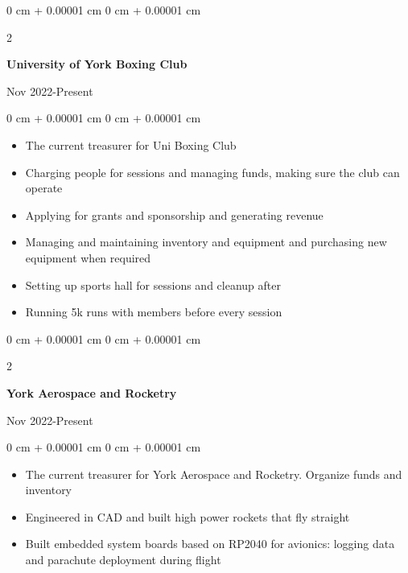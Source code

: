 \documentclass[10pt, letterpaper]{article}
\newenvironment{onecolentry}{
    \begin{adjustwidth}{
        0 cm + 0.00001 cm
    }{
        0 cm + 0.00001 cm
    }
}{
    \end{adjustwidth}
} %
\newenvironment{twocolentry}[2][]{
    \onecolentry
    \def\secondColumn{#2}
    \setcolumnwidth{\fill, 4.5 cm}
    \begin{paracol}{2}
}{
    \switchcolumn \raggedleft \secondColumn
    \end{paracol}
    \endonecolentry
} %
\begin{document}
        \begin{samepage}
            \begin{twocolentry}{
                Nov 2022-Present
            }
                \textbf{University of York Boxing Club}

                \vspace{0.10 cm}
            \end{twocolentry}


            \vspace{0.10 cm}

            \begin{onecolentry}
                \begin{itemize}
                    \item The current treasurer for Uni Boxing Club
                    \item Charging people for sessions and managing funds, making sure the club can operate
                    \item Applying for grants and sponsorship and generating revenue
                    \item Managing and maintaining inventory and equipment and purchasing new equipment when required
                    \item Setting up sports hall for sessions and cleanup after
                    \item Running 5k runs with members before every session
                \end{itemize}
            \end{onecolentry}

        \vspace{0.10 cm}

            \begin{twocolentry}{
                Nov 2022-Present
            }
                \textbf{York Aerospace and Rocketry}

                \vspace{0.10 cm}
            \end{twocolentry}


            \vspace{0.10 cm}

            \begin{onecolentry}
                \begin{itemize}
                    \item The current treasurer for York Aerospace and Rocketry. Organize funds and inventory
                    \item Engineered in CAD and built high power rockets that fly straight
                    \item Built embedded system boards based on RP2040 for avionics: logging data and parachute deployment during flight
                \end{itemize}
            \end{onecolentry}


\end{samepage}
\end{document}
